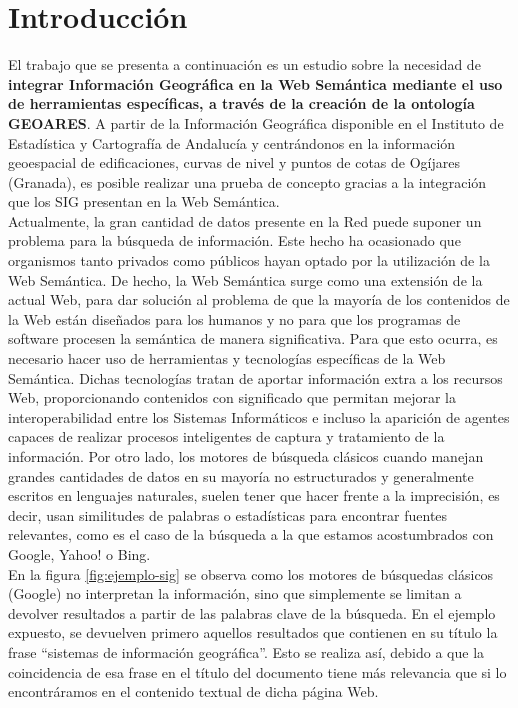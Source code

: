 \section{Introducción}



El trabajo que se presenta a continuación es un estudio sobre la necesidad de \textbf{integrar Información Geográfica en la Web Semántica mediante el uso de herramientas específicas, a través de la creación de la ontología GEOARES}. A partir de la Información Geográfica disponible en el Instituto de Estadística y Cartografía de Andalucía y centrándonos en la información geoespacial de edificaciones, curvas de nivel y puntos de cotas de Ogíjares (Granada), es posible realizar una prueba de concepto gracias a la integración que los SIG presentan en la Web Semántica.\\

Actualmente, la gran cantidad de datos presente en la Red puede suponer un problema para la búsqueda de información. Este hecho ha ocasionado que organismos tanto privados como públicos hayan optado por la utilización de la Web Semántica. De hecho, la Web Semántica surge como una extensión de la actual Web, para dar solución al problema de que la mayoría de los contenidos de la Web están diseñados para los humanos y no para que los programas de software procesen la semántica de manera significativa. Para que esto ocurra, es necesario hacer uso de herramientas y tecnologías específicas de la Web Semántica. Dichas tecnologías tratan de aportar información extra a los recursos Web, proporcionando contenidos con significado que permitan mejorar la interoperabilidad entre los Sistemas Informáticos e incluso la aparición de agentes capaces de realizar procesos inteligentes de captura y tratamiento de la información. Por otro lado, los motores de búsqueda clásicos cuando manejan grandes cantidades de datos en su mayoría no estructurados y generalmente escritos en lenguajes naturales, suelen tener que hacer frente a la imprecisión, es decir, usan similitudes de palabras o estadísticas para encontrar fuentes relevantes, como es el caso de la búsqueda a la que estamos acostumbrados con Google, Yahoo! o Bing.\\



En la figura \ref{fig:ejemplo-sig} se observa como los motores de búsquedas clásicos (Google) no interpretan la información, sino que simplemente se limitan a devolver resultados a partir de las palabras clave de la búsqueda. En el ejemplo expuesto, se devuelven primero aquellos resultados que contienen en su título la frase ``sistemas de información geográfica''. Esto se realiza así, debido a que la coincidencia de esa frase en el título del documento tiene más relevancia que si lo encontráramos en el contenido textual de dicha página Web.

